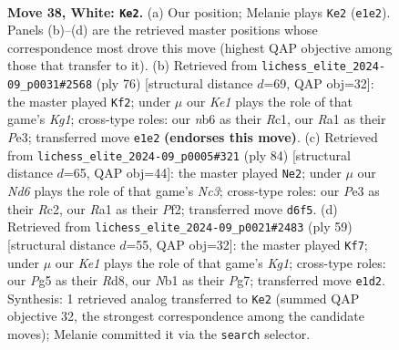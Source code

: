 \documentclass[11pt]{article}
\begin{document}
\clearpage

\begin{figure}[p]\centering
\begin{subfigure}{0.46\textwidth}\centering
\resizebox{\linewidth}{!}{%
\newchessgame
\chessboard[
  setfen={5k2/2r2ppp/rnbN4/p3p1P1/8/1P2P1R1/P5PP/RN2K3 w - - 4 38},
  showmover=false,
  pgfstyle=straightmove, color=movearrow, markmove={e1-e2}
]}
\caption{}
\end{subfigure}\hfill
\begin{subfigure}{0.46\textwidth}\centering
\resizebox{\linewidth}{!}{%
\newchessgame
\chessboard[
  setfen={1r5r/4bpk1/pp2p3/n7/P1PP1N2/2R1PpP1/8/2R3K1 w - - 0 39},
  showmover=false,
  pgfstyle=straightmove, color=movearrow, markmove={g1-f2}
]}
\caption{}
\end{subfigure}
\\[4pt]
\begin{subfigure}{0.46\textwidth}\centering
\resizebox{\linewidth}{!}{%
\newchessgame
\chessboard[
  setfen={1r3b2/r4pk1/2p5/3p4/p2P1PB1/1nN3P1/1PR2PK1/7R w - - 12 43},
  showmover=false,
  pgfstyle=straightmove, color=movearrow, markmove={c3-e2}
]}
\caption{}
\end{subfigure}\hfill
\begin{subfigure}{0.46\textwidth}\centering
\resizebox{\linewidth}{!}{%
\newchessgame
\chessboard[
  setfen={3r2k1/1pr3pp/8/pP6/Pn1p1PP1/3P4/1B3R1P/3R2K1 b - - 0 30},
  showmover=false,
  pgfstyle=straightmove, color=movearrow, markmove={g8-f7}
]}
\caption{}
\end{subfigure}
\caption{\textbf{Move 38, White: \texttt{Ke2}.} (a) Our position; Melanie plays \texttt{Ke2} (\texttt{e1e2}). Panels (b)--(d) are the retrieved master positions whose correspondence most drove this move (highest QAP objective among those that transfer to it). (b) Retrieved from \texttt{lichess\_elite\_2024-09\_p0031\#2568} (ply 76) [structural distance $d$=69, QAP obj=32]: the master played \texttt{Kf2}; under $\mu$ our \emph{Ke1} plays the role of that game's \emph{Kg1}; cross-type roles: our \emph{n}b6 as their \emph{R}c1, our \emph{R}a1 as their \emph{P}e3; transferred move \texttt{e1e2} \textbf{(endorses this move)}. (c) Retrieved from \texttt{lichess\_elite\_2024-09\_p0005\#321} (ply 84) [structural distance $d$=65, QAP obj=44]: the master played \texttt{Ne2}; under $\mu$ our \emph{Nd6} plays the role of that game's \emph{Nc3}; cross-type roles: our \emph{P}e3 as their \emph{R}c2, our \emph{R}a1 as their \emph{P}f2; transferred move \texttt{d6f5}. (d) Retrieved from \texttt{lichess\_elite\_2024-09\_p0021\#2483} (ply 59) [structural distance $d$=55, QAP obj=32]: the master played \texttt{Kf7}; under $\mu$ our \emph{Ke1} plays the role of that game's \emph{Kg1}; cross-type roles: our \emph{P}g5 as their \emph{R}d8, our \emph{N}b1 as their \emph{P}g7; transferred move \texttt{e1d2}. Synthesis: 1 retrieved analog transferred to \texttt{Ke2} (summed QAP objective 32, the strongest correspondence among the candidate moves); Melanie committed it via the \texttt{search} selector.}
\label{fig:thought-m74}
\end{figure}
\end{document}
